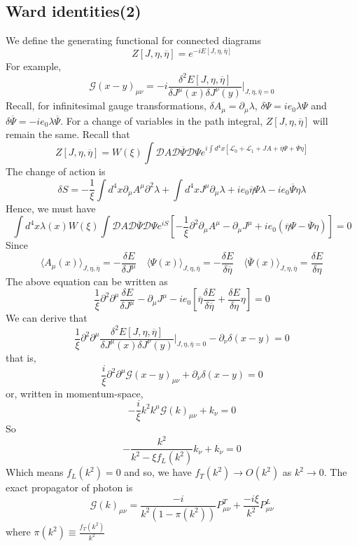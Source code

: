 \documentclass[cyan]{elegantnote}
\begin{document}
\subsection{Ward identities(2)}
\noindent
We define the generating functional for connected diagrams
\[Z[J,\eta,\overline{\eta}] = e^{-iE[J,\eta,\overline{\eta}]}\]
For example,
\[\mathcal{G}(x-y)_{\mu\nu} = -i  \frac{\delta^2 E[J,\eta,\overline{\eta}]}{\delta J^{\mu}(x) \delta J^{\nu}(y)}\bigg|_{J,\eta,\overline{\eta}=0}\]
Recall, for infinitesimal gauge transformations, $\delta A_{\mu} = \partial_{\mu} \lambda $, $\delta \Psi = ie_0\lambda\Psi$ and $\delta \overline{\Psi}  = -ie_0 \lambda \overline{\Psi}$. For a change of
variables in the path integral, $Z[J,\eta,\overline{\eta}]$ will remain the same. 
Recall that
\[Z[J,\eta,\overline{\eta}] = W(\xi) \int \mathcal{D}A \mathcal{D}\overline{\Psi} \mathcal{D}\Psi e^{i\int d^4x [\mathcal{L}_0 + \mathcal{L}_1 + JA + \overline{\eta}\Psi + \overline{\Psi}\eta]} \]
The change of action is
\[\delta S = -\frac{1}{\xi} \int d^4x \partial_{\mu} A^{\mu} \partial^2 \lambda + \int d^4x J^{\mu}\partial_{\mu}\lambda + ie_0\overline{\eta}\Psi\lambda - ie_0\overline{\Psi}\eta\lambda\]
Hence, we must have
\[\int d^4x \lambda(x) W(\xi)\int \mathcal{D}A \mathcal{D}\overline{\Psi} \mathcal{D}\Psi e^{iS} \left[ -\frac{1}{\xi} \partial^2 \partial_{\mu} A^{\mu} - \partial_{\mu}J^{\mu}  + ie_0(\overline{\eta}\Psi - \overline{\Psi}\eta)\right] = 0 \]
Since
\[\langle A_{\mu}(x) \rangle_{J,\eta,\overline{\eta}} = - \frac{\delta E}{\delta J^{\mu}} \quad \langle \Psi(x) \rangle_{J,\eta,\overline{\eta}} = - \frac{\delta E}{\delta \overline{\eta}} \quad \langle \overline{\Psi}(x) \rangle_{J,\eta,\overline{\eta}} =  \frac{\delta E}{\delta \eta}\]
The above equation can be written as
\[\frac{1}{\xi} \partial^2 \partial^{\mu}\frac{\delta E}{\delta J^{\mu}} - \partial_{\mu}J^{\mu} - ie_0\left[ \overline{\eta}\frac{\delta E}{\delta \overline{\eta}} + \frac{\delta E}{\delta \eta} \eta \right]=0\]
We can derive that
\[\frac{1}{\xi} \partial^2 \partial^{\mu} \frac{\delta^2 E[J,\eta,\overline{\eta}]}{\delta J^{\mu}(x) \delta J^{\nu}(y)}\bigg|_{J,\eta,\overline{\eta}=0} - \partial_{\nu} \delta(x-y) = 0\]
that is,
\[\frac{i}{\xi}\partial^2 \partial^{\mu} \mathcal{G}(x-y)_{\mu\nu}+ \partial_{\nu} \delta(x-y) = 0 \]
or, written in momentum-space,
\[-\frac{i}{\xi}k^2 k^{\mu} \mathcal{G}(k)_{\mu\nu}+ k_{\nu} = 0\]
So
\[- \frac{k^2}{k^2-\xi f_L(k^2)} k_{\nu} + k_{\nu} = 0\]
Which means $f_L(k^2) =0$ and so, we have $f_T(k^2) \to O(k^2)$ as $k^2 \to 0$. The exact propagator of photon is
\[\mathcal{G}(k)_{\mu\nu} = \frac{-i}{k^2(1-\pi(k^2))}P^T_{\mu\nu} + \frac{-i\xi}{k^2} P^L_{\mu\nu}\]
where $\pi(k^2) \equiv \frac{f_T(k^2)}{k^2}$
\end{document}
